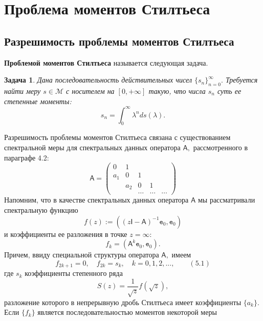 \documentclass[12pt,a4paper]{article}
\theoremstyle{plain}   \newtheorem{Pro}{Задача}
\begin{document}
\section{Проблема моментов Стилтьеса}
\subsection{Разрешимость проблемы моментов Стилтьеса}
{\bfseries Проблемой моментов Стилтьеса}
называется следующая задача.
\begin{Pro}
Дана последовательность действительных чисел
$ \{ s_n \} _{n=0}^{\infty} . $
Требуется найти меру
$ s \in \mathcal{M} $
с носителем на
$ [0,+\infty] $
такую, что числа
$ s_n $
суть ее степенные моменты:
\begin{equation*}
  s_n =\int _0 ^{\infty} \lambda ^n ds( \lambda ).
\end{equation*}
\end{Pro}
Разрешимость проблемы моментов Стилтьеса связана с
существованием спектральной меры для спектральных данных
оператора
$ \mathsf{A} , $
рассмотренного в параграфе 4.2:
\begin{equation*}
  \mathsf{A}=
    \begin{pmatrix}
	  0 & 1 & \; & \; & \; \; \\
	  a_1 & 0 & 1 & \; & \; \; \\
	  \; & a_2 & 0 & 1 & \; \; \\
	  \; & \; & \dots & \dots & \dots
	\end{pmatrix}
\end{equation*}
Напомним, что в качестве спектральных данных оператора
$ \mathsf{A} $
мы рассматривали спектральную функцию
$$
  f(z):=((z \mathsf{I}-\mathsf{A})^{-1}
    \mathtt{e}_0 ,\mathtt{e}_0 )
$$
и коэффициенты ее разложения в точке
$ z=\infty : $
$$
  f_k =(\mathsf{A}^k \mathtt{e}_0 , \mathtt{e}_0 ).
$$
Причем, ввиду специальной структуры оператора
$ \mathsf{A} , $
имеем
$$
  f_{2k+1}=0, \quad f_{2k}=s_k , \quad
     k=0,1,2,..., \qquad (5.1)
$$
где
$ s_k $
коэффициенты степенного ряда
$$
  S(z)=\frac{1}{\sqrt{z}}f(\sqrt{z}),
$$
разложение которого в непрерывную дробь Стилтьеса
имеет коэффициенты
$ \{ a_k \} . $
Если
$ \{ f_k \} $
является последовательностью моментов некоторой меры
\end{document}
